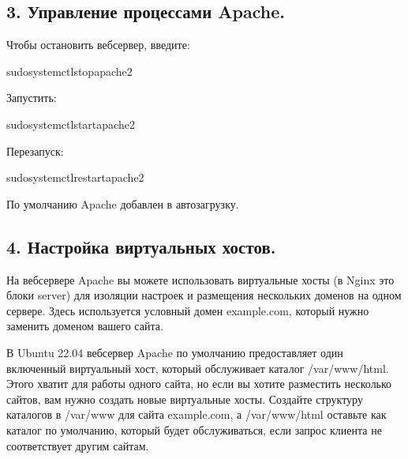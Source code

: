 \documentclass[letterpaper,10pt,russian]{sphinxmanual}
\begin{document}
\subsection{3. Управление процессами Apache.}
\label{\detokenize{docs:id5}}
\sphinxAtStartPar
Чтобы остановить веб\sphinxhyphen{}сервер, введите:

\begin{sphinxVerbatim}[commandchars=\\\{\}]
\PYGZdl{}sudosystemctlstopapache2
\end{sphinxVerbatim}

\sphinxAtStartPar
Запустить:

\begin{sphinxVerbatim}[commandchars=\\\{\}]
\PYGZdl{}sudosystemctlstartapache2
\end{sphinxVerbatim}

\sphinxAtStartPar
Перезапуск:

\begin{sphinxVerbatim}[commandchars=\\\{\}]
\PYGZdl{}sudosystemctlrestartapache2
\end{sphinxVerbatim}

\sphinxAtStartPar
По умолчанию Apache добавлен в автозагрузку.


\subsection{4. Настройка виртуальных хостов.}
\label{\detokenize{docs:id6}}
\sphinxAtStartPar
На веб\sphinxhyphen{}сервере Apache вы можете использовать виртуальные хосты (в Nginx это блоки server) для изоляции настроек и
размещения нескольких доменов на одном сервере. Здесь используется условный домен example.com, который нужно заменить доменом вашего сайта.

\sphinxAtStartPar
В Ubuntu 22.04 веб\sphinxhyphen{}сервер Apache по умолчанию предоставляет один включенный виртуальный хост,
который обслуживает каталог /var/www/html. Этого хватит для работы одного сайта, но если вы хотите
разместить несколько сайтов, вам нужно создать новые виртуальные хосты. Создайте структуру каталогов
в /var/www для сайта example.com, а /var/www/html оставьте как каталог по умолчанию, который будет
обслуживаться, если запрос клиента не соответствует другим сайтам.
\end{document}
